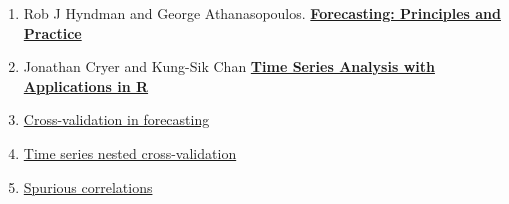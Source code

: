 \documentclass[
  letterpaper,
  DIV=11,
  numbers=noendperiod]{scrreprt}
\providecommand{\tightlist}{%
  \setlength{\itemsep}{0pt}\setlength{\parskip}{0pt}}\usepackage{longtable,booktabs,array}
\begin{document}
\begin{enumerate}
\def\labelenumi{\arabic{enumi}.}
\tightlist
\item
  Rob J Hyndman and George Athanasopoulos.
  \href{https://otexts.com/fpp2/}{\textbf{Forecasting: Principles and
  Practice}}
\item
  Jonathan Cryer and Kung-Sik Chan
  \href{https://mybiostats.files.wordpress.com/2015/03/time-series-analysis-with-applications-in-r-cryer-and-chan.pdf}{\textbf{Time
  Series Analysis with Applications in R}}
\item
  \href{https://www.r-bloggers.com/time-series-forecast-cross-validation-by-ellis2013nz/}{Cross-validation
  in forecasting}
\item
  \href{https://towardsdatascience.com/time-series-nested-cross-validation-76adba623eb9}{Time
  series nested cross-validation}
\item
  \href{https://www.tylervigen.com/spurious-correlations}{Spurious
  correlations}
\end{enumerate}
\end{document}
